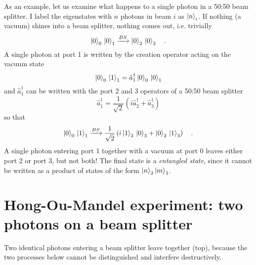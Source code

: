 As an example, let us examine what happens to a single photon in a 50:50 beam splitter. I label the eigenstates
with $n$ photons in beam $i$ as $\ket{n}_i$. If nothing (a vacuum) shines into a beam splitter, nothing comes out, i.e. trivially
\begin{equation}
    \ket{0}_0 \,  \ket{0}_1  \xrightarrow{BS}  \ket{0}_2 \,  \ket{0}_3 \quad .
\end{equation}
A single photon at port 1 is written by the creation operator acting on the vacuum state
\begin{equation}
    \ket{0}_0 \,  \ket{1}_1 = \hat{a}^\dagger_1 \ket{0}_0 \,  \ket{0}_1 
\end{equation}
and $\hat{a}^\dagger_1$ can be written with the port 2 and 3 operators of a 50:50 beam splitter
\begin{equation}
    \hat{a}^\dagger_1 = \frac{1}{\sqrt{2}} \left( i \hat{a}^\dagger_2 + \hat{a}^\dagger_3 \right)
\end{equation}
so that 
\begin{equation}
    \ket{0}_0 \,  \ket{1}_1  \xrightarrow{BS} \frac{1}{\sqrt{2}} \left( i   \ket{1}_2 \,  \ket{0}_3 +   \ket{0}_2 \,  \ket{1}_3 \right) \quad .
\end{equation}
A single photon entering port 1 together with a vacuum at port 0 leaves either port 2 or port 3, but not both! The final state is a \emph{entangled state}, since it cannot be written as a product of states of the form $\ket{n}_2 \ket{m}_3$.




\section{Hong-Ou-Mandel experiment: two photons on a beam splitter}

\begin{marginfigure}
    \caption{Two identical photons entering a beam splitter leave together (top), because the two processes below cannot be distinguished and interfere destructively.}
\end{marginfigure}


